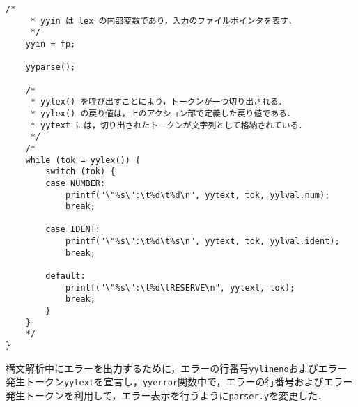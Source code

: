 \documentclass[uplatex]{jsarticle}
\begin{document}
\begin{lstlisting}[caption=scanner.lの修正,label=lst:ex2:scanner.l]
    /*
     * yyin は lex の内部変数であり，入力のファイルポインタを表す．
     */
    yyin = fp;

    yyparse();

    /*
     * yylex() を呼び出すことにより，トークンが一つ切り出される．
     * yylex() の戻り値は，上のアクション部で定義した戻り値である．
     * yytext には，切り出されたトークンが文字列として格納されている．
     */
    /*
    while (tok = yylex()) {
        switch (tok) {
        case NUMBER:
            printf("\"%s\":\t%d\t%d\n", yytext, tok, yylval.num);
            break;

        case IDENT:
            printf("\"%s\":\t%d\t%s\n", yytext, tok, yylval.ident);
            break;

        default:
            printf("\"%s\":\t%d\tRESERVE\n", yytext, tok);
            break;
        }
    }
    */
}

\end{lstlisting}

構文解析中にエラーを出力するために，エラーの行番号\verb#yylineno#およびエラー発生トークン\verb#yytext#を宣言し，\verb#yyerror#関数中で，エラーの行番号およびエラー発生トークンを利用して，エラー表示を行うように\verb#parser.y#を変更した．
\end{document}
